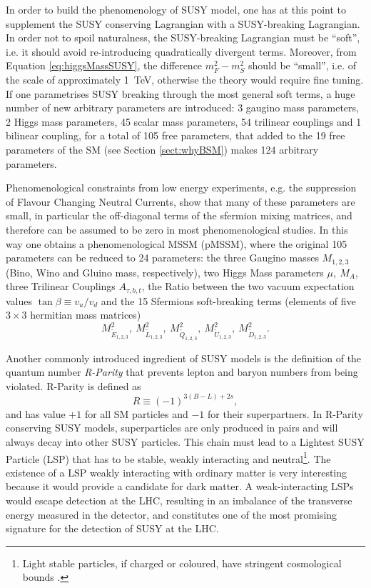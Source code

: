 In order to build the phenomenology of SUSY model, one has at this point to supplement the SUSY conserving Lagrangian with
a SUSY-breaking Lagrangian. In order not to spoil naturalness, the SUSY-breaking Lagrangian must be ``soft'', i.e. it should avoid re-introducing quadratically divergent terms. Moreover, from Equation \ref{eq:higgsMassSUSY}, the difference $m_{F}^{2} - m_{S}^{2}$ should be ``small'', i.e. of the scale of approximately 1~TeV, otherwise the theory would require fine tuning. If one parametrises SUSY breaking through the most general soft terms, a huge number of new arbitrary parameters are introduced: 3 gaugino mass parameters, 2 Higgs mass parameters, 45 scalar mass parameters, 54 trilinear couplings and 1 bilinear coupling, for a total of 105 free parameters, that added to the 19 free parameters of the SM (see Section \ref{sect:whyBSM}) makes 124 arbitrary parameters.

Phenomenological constraints from low energy experiments, e.g. the suppression of Flavour Changing Neutral Currents, show that many of these parameters are small, in particular the off-diagonal terms of the sfermion mixing matrices, and therefore can be assumed to be zero in most phenomenological studies. In this way  one obtains a phenomenological MSSM (pMSSM), where the original 105 parameters can be reduced to 24 parameters: the three Gaugino masses $M_{1,2,3}$ (Bino, Wino and Gluino mass, respectively), two Higgs Mass parameters $\mu, \ M_{A}$, three Trilinear Couplings $A_{\tau,b,t}$, the Ratio between the two vacuum expectation values $ \tan\beta \equiv v_{u}/v_{d}$ and the 15 Sfermions soft-breaking terms (elements of five $3\times3$ hermitian mass matrices) \begin{equation}M^2_{\tilde{E}_{1,2,3}}, \ M^2_{\tilde{L}_{1,2,3}}, \ M^2_{\tilde{Q}_{1,2,3}}, \ M^2_{\tilde{U}_{1,2,3}}, \ M^2_{\tilde{D}_{1,2,3}}.\end{equation} 


Another commonly introduced ingredient of SUSY models is the definition of the quantum number \textit{R-Parity} that prevents lepton and baryon numbers from being violated. R-Parity is defined as 
\begin{equation}
\label{eq:RParity}
R \equiv (-1)^{3(B-L) + 2s},
\end{equation} 
and has value $+1$ for all SM particles and $-1$ for their superpartners. In R-Parity conserving SUSY models, superparticles are only produced in  pairs and will always decay into other SUSY particles. This chain must lead to a Lightest SUSY Particle (LSP) that has to be stable, weakly interacting  and  neutral\footnote{Light stable particles, if charged or coloured, have stringent cosmological bounds \cite{dawson-1997}.}. The existence of a LSP weakly interacting with ordinary matter is very interesting because it would provide a  candidate for dark matter. A weak-interacting LSPs would escape detection at the LHC, resulting in an imbalance of the transverse energy measured in the detector, and constitutes one of the most promising signature for the detection of SUSY at the LHC.

